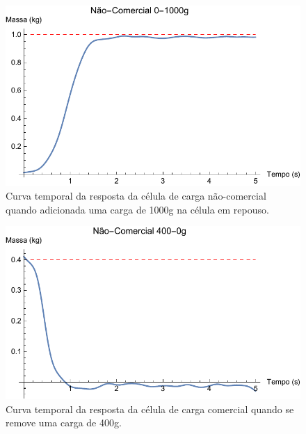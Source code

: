 \documentclass[a4paper]{instrumentacao}
\begin{document}
\begin{figure}[H]
\center
\includegraphics[width=\textwidth]{NaoComercial_0-1000g.pdf}
\caption{Curva temporal da resposta da célula de carga não-comercial quando adicionada uma carga de 1000g na célula em repouso.}
\label{fig:celula-nao-comercial-resultado-0-1000g}
\end{figure}

\begin{figure}[H]
\center
\includegraphics[width=\textwidth]{NaoComercial_400g-0.pdf}
\caption{Curva temporal da resposta da célula de carga comercial quando se remove uma carga de 400g.}
\label{fig:celula-nao-comercial-resultado-400-0g}
\end{figure}
\end{document}
